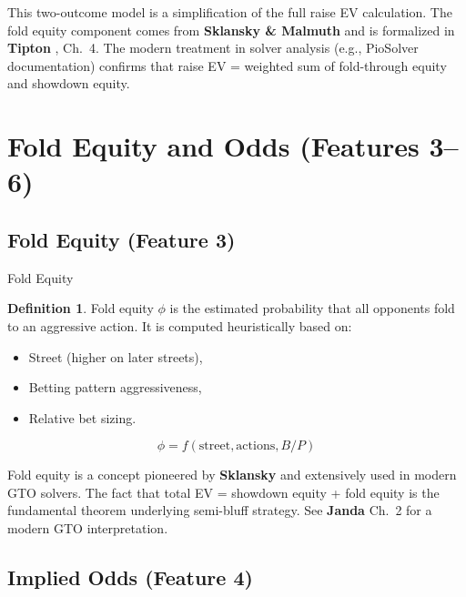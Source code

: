 \documentclass[11pt, a4paper]{article}
\theoremstyle{definition}
\newtheorem{definition}{Definition}[section]
\begin{document}
\begin{refbox}
This two-outcome model is a simplification of the full raise EV calculation. The fold equity component comes from \textbf{Sklansky \& Malmuth} \cite{sklansky1999} and is formalized in \textbf{Tipton} \cite{tipton2019}, Ch.~4. The modern treatment in solver analysis (e.g., PioSolver documentation) confirms that raise EV = weighted sum of fold-through equity and showdown equity.
\end{refbox}

\section{Fold Equity and Odds (Features 3--6)}

\subsection{Fold Equity (Feature 3)}

\begin{featurebox}{Fold Equity}
\begin{definition}
Fold equity $\phi$ is the estimated probability that all opponents fold to an aggressive action. It is computed heuristically based on:
\begin{itemize}
    \item Street (higher on later streets),
    \item Betting pattern aggressiveness,
    \item Relative bet sizing.
\end{itemize}
\begin{equation}
    \phi = f(\text{street}, \text{actions}, B/P)
\end{equation}
\end{definition}
\end{featurebox}

\begin{refbox}
Fold equity is a concept pioneered by \textbf{Sklansky} \cite{sklansky1999} and extensively used in modern GTO solvers. The fact that total EV = showdown equity + fold equity is the fundamental theorem underlying semi-bluff strategy. See \textbf{Janda} \cite{janda2017} Ch.~2 for a modern GTO interpretation.
\end{refbox}

\subsection{Implied Odds (Feature 4)}
\end{document}
